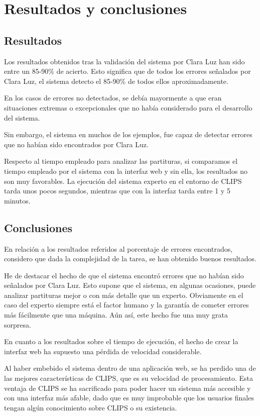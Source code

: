 \chapter{Resultados y conclusiones}

\section{Resultados}

Los resultados obtenidos tras la validación del sistema por Clara Luz han sido entre un 85-90\% de acierto. Esto significa que de todos los errores señalados por Clara Luz, el sistema detecto el 85-90\% de todos ellos aproximadamente.

En los casos de errores no detectados, se debía mayormente a que eran situaciones extremas o excepcionales que no había considerado para el desarrollo del sistema.

Sin embargo, el sistema en muchos de los ejemplos, fue capaz de detectar errores que no habían sido encontrados por Clara Luz.

\bigskip
Respecto al tiempo empleado para analizar las partituras, si comparamos el tiempo empleado por el sistema con la interfaz web y sin ella, los resultados no son muy favorables. La ejecución del sistema experto en el entorno de CLIPS tarda unos pocos segundos, mientras que con la interfaz tarda entre 1 y 5 minutos. 

\section{Conclusiones}

En relación a los resultados referidos al porcentaje de errores encontrados, considero que dada la complejidad de la tarea, se han obtenido buenos resultados. 

He de destacar el hecho de que el sistema encontró errores que no habían sido señalados por Clara Luz. Esto supone que el sistema, en algunas ocasiones, puede analizar partituras mejor o con más detalle que un experto. Obviamente en el caso del experto siempre está el factor humano y la garantía de cometer errores más fácilmente que una máquina. Aún así, este hecho fue una muy grata sorpresa.

\bigskip
En cuanto a los resultados sobre el tiempo de ejecución, el hecho de crear la interfaz web ha supuesto una pérdida de velocidad considerable. 

Al haber embebido el sistema dentro de una aplicación web, se ha perdido una de las mejores características de CLIPS, que es su velocidad de procesamiento. Esta ventaja de CLIPS se ha sacrificado para poder hacer un sistema más accesible y con una interfaz más afable, dado que es muy improbable que los usuarios finales tengan algún conocimiento sobre CLIPS o su existencia.

